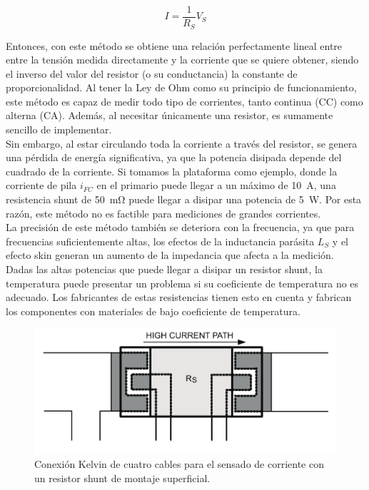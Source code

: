 \begin{equation}\label{ec_shunt}
    I=\frac{1}{R_S}V_S
\end{equation}

Entonces, con este método se obtiene una relación {\Medium perfectamente lineal} entre entre la tensión medida directamente y la corriente que se quiere obtener, siendo el inverso del valor del resistor (o su conductancia) la constante de proporcionalidad. Al tener la Ley de Ohm como su principio de funcionamiento, este método es capaz de medir todo tipo de corrientes, tanto continua (CC) como alterna (CA). Además, al necesitar únicamente una resistor, es {\Medium sumamente sencillo} de implementar.\\

Sin embargo, al estar circulando toda la corriente a través del resistor, se genera una {\Medium pérdida de energía significativa}, ya que la potencia disipada depende del cuadrado de la corriente. Si tomamos la plataforma como ejemplo, donde la corriente de pila $i_{FC}$ en el primario puede llegar a un máximo de \SI[]{10}[]{\ampere}, una resistencia shunt de \SI[]{50}[]{\milli\ohm} puede llegar a disipar una potencia de \SI[]{5}[]{\watt}. Por esta razón, este método no es factible para mediciones de grandes corrientes.\\

La precisión de este método también se {\Medium deteriora con la frecuencia}, ya que para frecuencias suficientemente altas, los efectos de la inductancia parásita $L_S$ y el efecto skin generan un aumento de la impedancia que afecta a la medición.\\

Dadas las altas potencias que puede llegar a disipar un resistor shunt, la temperatura puede presentar un problema si su coeficiente de temperatura no es adecuado. Los fabricantes de estas resistencias tienen esto en cuenta y fabrican los componentes con materiales de bajo coeficiente de temperatura.\\

\begin{figure}[h]
    \centering
    \includegraphics[scale=1.1]{Imagenes/Conexion Kelvin.png}
    \caption{Conexión Kelvin de cuatro cables para el sensado de corriente con un resistor shunt de montaje superficial.}
    \label{conexion_kelvin}
\end{figure}

